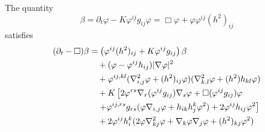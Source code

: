 \documentclass{amsart}
\begin{document}
\begin{lemma}
\label{lem:evbeta}
The quantity 
\[
\beta = \partial_t \varphi - K\varphi^{ij}g_{ij}\varphi = \Box\varphi +  \varphi\varphi^{ij} (h^2)_{ij}
\]
satisfies
\[
\begin{split}
(\partial_{t} - \Box)\beta &= \left(\varphi^{ij}(h^2)_{ij} + K\varphi^{ij}g_{ij} \right)\beta \\
&\quad + (\varphi - \varphi^{ij}h_{ij}) |\nabla\varphi|^{2} \\
&\quad + \varphi^{ij,kl} (\nabla^2_{i,j}\varphi + (h^2)_{ij}\varphi) (\nabla^2_{k,l} \varphi + (h^2)h_{kl}\varphi) \\
&\quad + K\left[2\varphi^{rs} \nabla_r (\varphi^{ij}g_{ij}) \nabla_s \varphi + \Box (\varphi^{ij}g_{ij}) \varphi \right.\\
&\quad \left. + \varphi^{ij,rs}g_{rs} (\varphi\nabla_{i,j}\varphi + h_{ik}h^{k}_{j}\varphi^{2}) + 2\varphi^{ij}h_{ij}\varphi^{2} \right] \\
&\quad + 2\varphi^{ij}h^{k}_{i} (2\varphi\nabla^2_{kj}\varphi + \nabla_k \varphi \nabla_j \varphi + (h^2)_{kj}\varphi^{2})
\end{split}
\]
\end{lemma}
\end{document}
